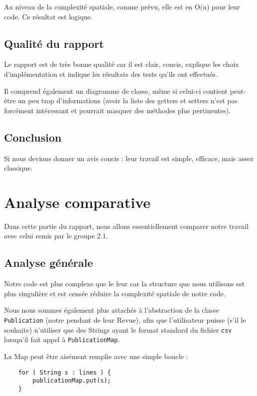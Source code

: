\documentclass[a4paper,10pt]{article}
\begin{document}
	Au niveau de la complexité spatiale, comme prévu, elle est en O(n) pour leur code. Ce résultat est logique.

\subsection{Qualité du rapport}

	Le rapport est de très bonne qualité car il est clair, concis, explique les choix d'implémentation et indique les résultats des tests qu'ils ont effectués. 
	
	Il comprend également un diagramme de classe, même si celui-ci contient peut-être un peu trop d'informations (avoir la liste des getters et setters n'est pas forcément intéressant et pourrait masquer des méthodes plus pertinentes).

\subsection{Conclusion}

	Si nous devions donner un avis concis : leur travail est simple, efficace, mais assez classique.



\section{Analyse comparative}

	Dans cette partie du rapport, nous allons essentiellement comparer notre travail avec celui remis par le groupe 2.1.
	
\subsection{Analyse générale}

	Notre code est plus complexe que le leur car la structure que nous utilisons est plus singulière et est censée réduire la complexité spatiale de notre code.
	
	Nous nous sommes également plus attachés à l'abstraction de la classe \texttt{Publication} (notre pendant de leur Revue), afin que l'utilisateur puisse (s'il le souhaite) n'utiliser que des Strings ayant le format standard du fichier \texttt{csv} lorsqu'il fait appel à \texttt{PublicationMap}.

	La Map peut être aisément remplie avec une simple boucle :
	
	\vspace{0.4cm}
	\begin{lstlisting}
	for ( String s : lines ) {
		publicationMap.put(s);
	}
	\end{lstlisting}
	
\end{document}
